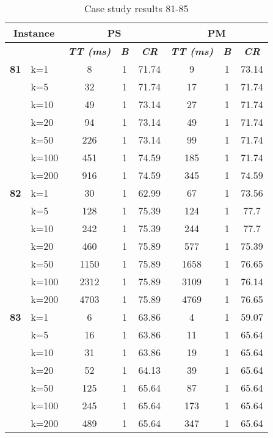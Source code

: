     \begin{table}[htbp]
    \caption{Case study results 81-85}
    \centering
    \begin{tabular}{|l|l|c|c|c|c|c|c|}
    \hline
    \multicolumn{ 2}{|c|}{\textbf{Instance}} & \multicolumn{ 3}{c|}{\textbf{PS}} & \multicolumn{ 3}{c|}{\textbf{PM}} \\ \hline
    \multicolumn{ 2}{|l|}{} & \textbf{\textit{TT (ms)}} & \textbf{\textit{B}} & \textbf{\textit{CR}} & \textbf{\textit{TT (ms)}} & \textbf{\textit{B}} & \textbf{\textit{CR}} \\ \hline
    \multicolumn{1}{|r|}{\textbf{81}} & k=1 & 8 & 1 & 71.74 & 9 & 1 & 73.14 \\ 
     & k=5 & 32 & 1 & 71.74 & 17 & 1 & 71.74 \\ 
     & k=10 & 49 & 1 & 73.14 & 27 & 1 & 71.74 \\ 
     & k=20 & 94 & 1 & 73.14 & 49 & 1 & 71.74 \\ 
     & k=50 & 226 & 1 & 73.14 & 99 & 1 & 71.74 \\ 
     & k=100 & 451 & 1 & 74.59 & 185 & 1 & 71.74 \\ 
     & k=200 & 916 & 1 & 74.59 & 345 & 1 & 74.59 \\ \hline
    \multicolumn{1}{|r|}{\textbf{82}} & k=1 & 30 & 1 & 62.99 & 67 & 1 & 73.56 \\ 
     & k=5 & 128 & 1 & 75.39 & 124 & 1 & 77.7 \\ 
     & k=10 & 242 & 1 & 75.39 & 244 & 1 & 77.7 \\ 
     & k=20 & 460 & 1 & 75.89 & 577 & 1 & 75.39 \\ 
     & k=50 & 1150 & 1 & 75.89 & 1658 & 1 & 76.65 \\ 
     & k=100 & 2312 & 1 & 75.89 & 3109 & 1 & 76.14 \\ 
     & k=200 & 4703 & 1 & 75.89 & 4769 & 1 & 76.65 \\ \hline
    \multicolumn{1}{|r|}{\textbf{83}} & k=1 & 6 & 1 & 63.86 & 4 & 1 & 59.07 \\ 
     & k=5 & 16 & 1 & 63.86 & 11 & 1 & 65.64 \\ 
     & k=10 & 31 & 1 & 63.86 & 19 & 1 & 65.64 \\ 
     & k=20 & 52 & 1 & 64.13 & 39 & 1 & 65.64 \\ 
     & k=50 & 125 & 1 & 65.64 & 87 & 1 & 65.64 \\ 
     & k=100 & 245 & 1 & 65.64 & 173 & 1 & 65.64 \\ 
     & k=200 & 489 & 1 & 65.64 & 347 & 1 & 65.64 \\ \hline

\end{tabular}
\end{table}
